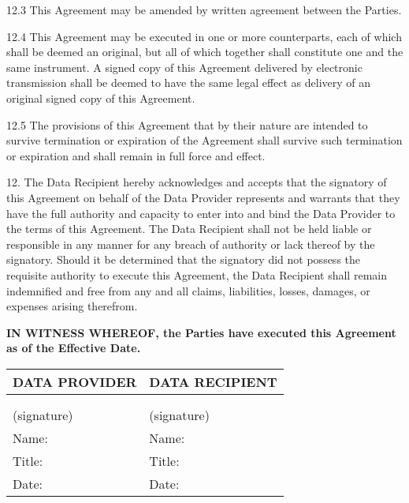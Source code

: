 {\begin{enumerate}
12.3 This Agreement may be amended by written agreement between the Parties.

12.4 This Agreement may be executed in one or more counterparts, each of which shall be deemed an original, but all of which together shall constitute one and the same instrument. A signed copy of this Agreement delivered by electronic transmission shall be deemed to have the same legal effect as delivery of an original signed copy of this Agreement.

12.5 The provisions of this Agreement that by their nature are intended to survive termination or expiration of the Agreement shall survive such termination or expiration and shall remain in full force and effect.


12. The Data Recipient hereby acknowledges and accepts that the signatory of this Agreement on behalf of the Data Provider represents and warrants that they have the full authority and capacity to enter into and bind the Data Provider to the terms of this Agreement. The Data Recipient shall not be held liable or responsible in any manner for any breach of authority or lack thereof by the signatory. Should it be determined that the signatory did not possess the requisite authority to execute this Agreement, the Data Recipient shall remain indemnified and free from any and all claims, liabilities, losses, damages, or expenses arising therefrom.

\vspace{0.5cm}

\textbf{IN WITNESS WHEREOF, the Parties have executed this Agreement as of the  Effective Date.}

\vspace{1cm}

\begin{tabular}{|p{}|p{}|}
\hline
\textbf{DATA PROVIDER} & \textbf{DATA RECIPIENT} \\
\hline
 & \\
 & \\
\hline
(signature) & (signature) \\
\hline
Name: & Name: \\
\hline
Title: & Title: \\
\hline
Date: & Date: \\
\hline
\end{tabular}


\end{enumerate}}
